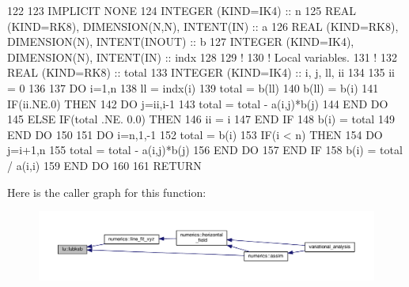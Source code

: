 \begin{DoxyCode}
122 
123 \textcolor{keywordtype}{IMPLICIT NONE}
124 \textcolor{keywordtype}{INTEGER (KIND=IK4)}                            :: n
125 \textcolor{keywordtype}{REAL (KIND=RK8)}, \textcolor{keywordtype}{DIMENSION(N,N)}, \textcolor{keywordtype}{INTENT(IN)}   :: a
126 \textcolor{keywordtype}{REAL (KIND=RK8)}, \textcolor{keywordtype}{DIMENSION(N)}, \textcolor{keywordtype}{INTENT(INOUT)}  :: b
127 \textcolor{keywordtype}{INTEGER (KIND=IK4)}, \textcolor{keywordtype}{DIMENSION(N)}, \textcolor{keywordtype}{INTENT(IN)}  :: indx
128 
129 \textcolor{comment}{!}
130 \textcolor{comment}{! Local variables.}
131 \textcolor{comment}{!}
132 \textcolor{keywordtype}{REAL (KIND=RK8)}                               :: total
133 \textcolor{keywordtype}{INTEGER (KIND=IK4)}                            :: i, j, ll, ii
134 
135 ii = 0
136 
137 \textcolor{keywordflow}{DO} i=1,n
138     ll = indx(i)
139     total = b(ll)
140     b(ll) = b(i)
141     \textcolor{keywordflow}{IF}(ii.NE.0) \textcolor{keywordflow}{THEN}
142         \textcolor{keywordflow}{DO} j=ii,i-1
143             total = total - a(i,j)*b(j)
144 \textcolor{keywordflow}{        END DO}
145     \textcolor{keywordflow}{ELSE} \textcolor{keywordflow}{IF}(total .NE. 0.0) \textcolor{keywordflow}{THEN}
146         ii = i
147 \textcolor{keywordflow}{    END IF}
148     b(i) = total
149 \textcolor{keywordflow}{END DO}
150 
151 \textcolor{keywordflow}{DO} i=n,1,-1
152     total = b(i)
153     \textcolor{keywordflow}{IF}(i < n) \textcolor{keywordflow}{THEN}
154         \textcolor{keywordflow}{DO} j=i+1,n
155             total = total - a(i,j)*b(j)
156 \textcolor{keywordflow}{        END DO}
157 \textcolor{keywordflow}{    END IF}
158     b(i) = total / a(i,i)
159 \textcolor{keywordflow}{END DO}
160 
161 \textcolor{keywordflow}{RETURN}
\end{DoxyCode}


Here is the caller graph for this function\+:\nopagebreak
\begin{figure}[H]
\begin{center}
\leavevmode
\includegraphics[width=350pt]{namespacelu_a588ba20d76e8dd5c49b370d9ba3ec379_icgraph}
\end{center}
\end{figure}


